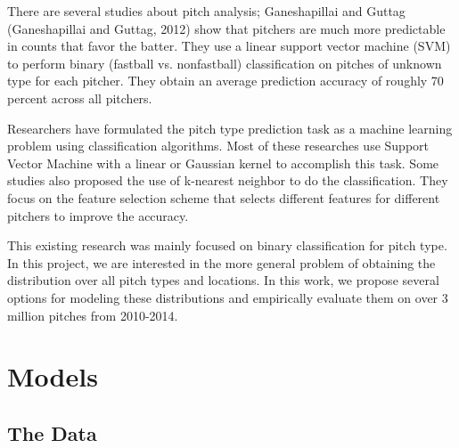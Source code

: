 \documentclass{article}
\begin{document}
There are several studies about pitch analysis; Ganeshapillai and Guttag (Ganeshapillai and Guttag, 2012)\cite{ganeshapillai2012predicting} show that pitchers are much more predictable in counts that favor the batter. They use a linear support vector machine (SVM) to perform binary (fastball vs. nonfastball) classification on pitches of unknown type for each pitcher. They obtain an average prediction accuracy of roughly 70 percent across all pitchers.

Researchers have formulated the pitch type prediction task as a machine learning problem using classification algorithms.  Most of these researches use Support Vector Machine with a linear or Gaussian kernel to accomplish this task. Some studies also proposed the use of k-nearest neighbor to do the classification\cite{hamilton2014applying}.  They focus on the feature selection scheme that selects different features for different pitchers to improve the accuracy. 

This existing research was mainly focused on binary classification for pitch type. In this project, we are interested in the more general problem of obtaining the distribution over all pitch types and locations.  In this work, we propose several options for modeling these distributions and empirically evaluate them on over 3 million pitches from 2010-2014.  

\section{Models}

\subsection{The Data}
\end{document}
